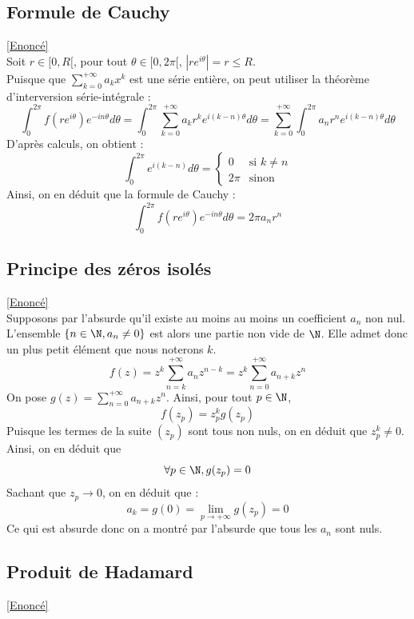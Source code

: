 \documentclass{book}
\begin{document}
	\subsection{Formule de Cauchy}\label{sec:formule-de-cauchy}
	\textcolor{blue}{\hyperref[Formule de Cauchy]{[Enoncé]}}\\
	Soit $r\in[0,R[$, pour tout $\theta\in[0,2\pi[$, $|re^{i\theta}|=r\leq R$.\\
	Puisque que $\sum_{k=0}^{+\infty}a_kx^k$ est une série entière, on peut utiliser la théorème d'interversion série-intégrale : 
	\[\int_{0}^{2\pi}f(re^{i\theta})e^{-in\theta}d\theta=\int_{0}^{2\pi}\sum_{k=0}^{+\infty}a_kr^ke^{i(k-n)\theta}d\theta=\sum_{k=0}^{+\infty}\int_{0}^{2\pi}a_nr^ne^{i(k-n)\theta}d\theta \]
	D'après calculs, on obtient : \[\int_{0}^{2\pi}e^{i(k-n)}d\theta=\begin{cases}
		0 &\mbox{si } k\ne n\\
		2\pi &\mbox{sinon}
	\end{cases}\]
	Ainsi, on en déduit que la formule de Cauchy :
	\[\int_{0}^{2\pi}f(re^{i\theta})e^{-in\theta}d\theta=2\pi a_nr^n\]
	\subsection{Principe des zéros isolés}\label{sec:principe-des-zeros-isoles}
	\textcolor{blue}{\hyperref[Principe des zéros isolés]{[Enoncé]}}\\
	Supposons par l'absurde qu'il existe au moins au moins un coefficient $a_n$ non nul.\\
	L'ensemble $\{n\in\N, a_n\ne 0\}$ est alors une partie non vide de $\N$. Elle admet donc un plus petit élément que nous noterons $k$.\\
	\[f(z)=z^k\sum_{n=k}^{+\infty}a_nz^{n-k}=z^k\sum_{n=0}^{+\infty}a_{n+k}z^n\]
	On pose $g(z)=\sum_{n=0}^{+\infty}a_{n+k}z^n$.
	Ainsi, pour tout $p\in\N$,\[f(z_p)=z_p^kg(z_p)\]
	Puisque les termes de la suite $(z_p)$ sont tous non nuls, on en déduit que $z_p^k\ne 0$. Ainsi, on en déduit que \[\forall p\in\N, g(z_p)=0\]
	Sachant que $z_p\to 0$, on en déduit que :
	\[a_k=g(0)=\lim\limits_{p\to+\infty}g(z_p)=0\]
	Ce qui est absurde donc on a montré par l'absurde que tous les $a_n$ sont nuls.
	\subsection{Produit de Hadamard}\label{sec:produit-de-hadamard}
	\textcolor{blue}{\hyperref[Produit de Hadamard]{[Enoncé]}}\\
\end{document}
